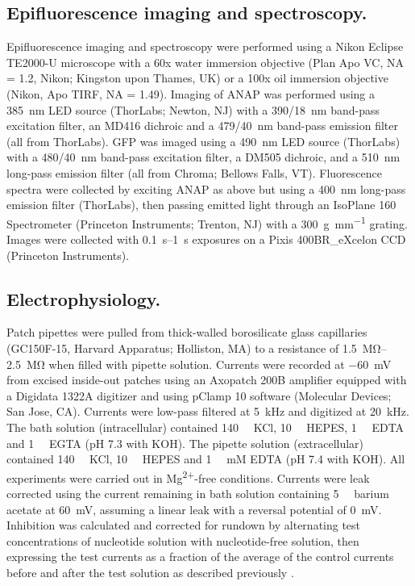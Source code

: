 \documentclass[10pt,lineno, doublespacing]{elife_modified}
\begin{document}
\subsection{Epifluorescence imaging and spectroscopy.}
Epifluorescence imaging and spectroscopy were performed using a Nikon Eclipse TE2000-U microscope with a 60x water immersion objective (Plan Apo VC, NA = 1.2, Nikon; Kingston upon Thames, UK) or a 100x oil immersion objective (Nikon, Apo TIRF, NA = 1.49).
Imaging of ANAP was performed using a \SI{385}{\nano\metre} LED source (ThorLabs; Newton, NJ) with a \SI{390/18}{\nano\metre} band-pass excitation filter, an MD416 dichroic and a \SI{479/40}{\nano\metre} band-pass emission filter (all from ThorLabs).
GFP was imaged using a \SI{490}{\nano\metre} LED source (ThorLabs) with a \SI{480/40}{\nano\metre} band-pass excitation filter, a DM505 dichroic, and a \SI{510}{\nano\metre} long-pass emission filter (all from Chroma; Bellows Falls, VT).
Fluorescence spectra were collected by exciting ANAP as above but using a \SI{400}{\nano\metre} long-pass emission filter (ThorLabs), then passing emitted light through an IsoPlane 160 Spectrometer (Princeton Instruments; Trenton, NJ) with a \SI{300}{\gram\per\milli\metre} grating.
Images were collected with \SIrange{0.1}{1}{\second} exposures on a Pixis 400BR\_eXcelon CCD (Princeton Instruments).

\subsection{Electrophysiology.}
Patch pipettes were pulled from thick-walled borosilicate glass capillaries (GC150F-15, Harvard Apparatus; Holliston, MA) to a resistance of \SIrange{1.5}{2.5}{\mega\ohm} when filled with pipette solution.
Currents were recorded at \SI{-60}{\milli\volt} from excised inside-out patches using an Axopatch 200B amplifier equipped with a Digidata 1322A digitizer and using pClamp 10 software (Molecular Devices; San Jose, CA).
Currents were low-pass filtered at \SI{5}{\kilo\hertz} and digitized at \SI{20}{\kilo\hertz}.
The bath solution (intracellular) contained \SI{140}{\milli\Molar} KCl, \SI{10}{\milli\Molar} HEPES, \SI{1}{\milli\Molar} EDTA and \SI{1}{\milli\Molar} EGTA (pH 7.3 with KOH).
The pipette solution (extracellular) contained \SI{140}{\milli\Molar} KCl, \SI{10}{\milli\Molar} HEPES and \SI{1}{\milli\Molar} mM EDTA (pH 7.4 with KOH).
All experiments were carried out in Mg\textsuperscript{2+}-free conditions.
Currents were leak corrected using the current remaining in bath solution containing \SI{5}{\milli\Molar} barium acetate at \SI{+60}{\milli\volt}, assuming a linear leak with a reversal potential of \SI{0}{\milli\volt}.
Inhibition was calculated and corrected for rundown by alternating test concentrations of nucleotide solution with nucleotide-free solution, then expressing the test currents as a fraction of the average of the control currents before and after the test solution as described previously \citep{RN28}.
\end{document}
